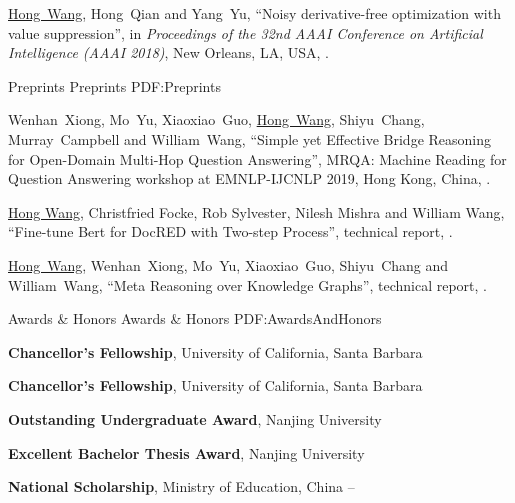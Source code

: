 \documentclass[letterpaper,MMMyyyy,nonstopmode]{simpleresumecv}
\begin{document}
\begin{Body}
\begin{enumerate}[label={[\arabic*]~~}]
\item
\underline{Hong~Wang}, Hong~Qian and Yang~Yu,
``Noisy derivative-free optimization with value suppression'',
in \textit{Proceedings of the 32nd AAAI Conference on Artificial Intelligence (AAAI 2018)},
New Orleans, LA, USA,
.
\end{enumerate}

\BigGap
\SubSection
{Preprints}
{Preprints}
{PDF:Preprints}
\begin{enumerate}[label={[\arabic*]~~}]
\item
Wenhan~Xiong, Mo~Yu, Xiaoxiao~Guo, \underline{Hong~Wang}, Shiyu~Chang, Murray~Campbell and William~Wang,
``Simple yet Effective Bridge Reasoning for Open-Domain Multi-Hop Question Answering'',
MRQA: Machine Reading for Question Answering workshop at EMNLP-IJCNLP 2019, Hong Kong, China,
.

\item
\underline{Hong Wang}, Christfried Focke, Rob Sylvester, Nilesh Mishra and William Wang,
``Fine-tune Bert for DocRED with Two-step Process'',
technical report,
.

\item
\underline{Hong~Wang}, Wenhan~Xiong, Mo~Yu, Xiaoxiao~Guo, Shiyu~Chang and William~Wang,
``Meta Reasoning over Knowledge Graphs'',
technical report,
.
\end{enumerate}



\Section
{Awards \&\newline
Honors}
{Awards \& Honors}
{PDF:AwardsAndHonors}

\Entry
\textbf{Chancellor's Fellowship}, University of California, Santa Barbara
\hfill
{}

\Gap
\Entry
\textbf{Chancellor's Fellowship}, University of California, Santa Barbara
\hfill
{}

\Gap
\Entry
\textbf{Outstanding Undergraduate Award}, Nanjing University
\hfill
{}

\Gap
\Entry
\textbf{Excellent Bachelor Thesis Award}, Nanjing University
\hfill
{}

\Gap
\Entry
\textbf{National Scholarship}, Ministry of Education, China
\hfill
{} -- 


\end{Body}
\end{document}
